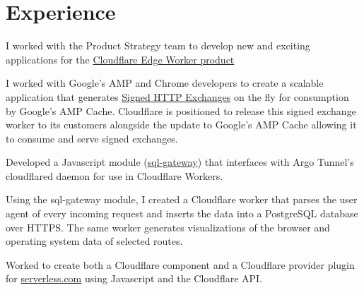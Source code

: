 \documentclass[]{deedy-resume-openfont}
\begin{document}
%
%

%
%


\section{Experience}

\vspace{\topsep}
I worked with the Product Strategy team to develop new and exciting applications for the \href{https://cloudflareworkers.com}{Cloudflare Edge Worker product}
\begin{tightemize}
\item I worked with Google's AMP and Chrome developers to create a scalable application that generates \href{https://tools.ietf.org/html/draft-yasskin-http-origin-signed-responses-04}{Signed HTTP Exchanges} on the fly for consumption by Google's AMP Cache. Cloudflare is positioned to release this signed exchange worker to its customers alongside the update to Google's AMP Cache allowing it to consume and serve signed exchanges.
\item Developed a Javascript module (\href{https://www.npmjs.com/package/sql-gateway}{sql-gateway}) that interfaces with Argo Tunnel's cloudflared daemon for use in Cloudflare Workers.
\item Using the sql-gateway module, I created a Cloudflare worker that parses the user agent of every incoming request and inserts the data into a PostgreSQL database over HTTPS. The same worker generates visualizations of the browser and operating system data of selected routes.
\item Worked to create both a Cloudflare component and a Cloudflare provider plugin for \href{https://serverless.com}{serverless.com} using Javascript and the Cloudflare API.
\end{tightemize}
\sectionsep
\end{document}
